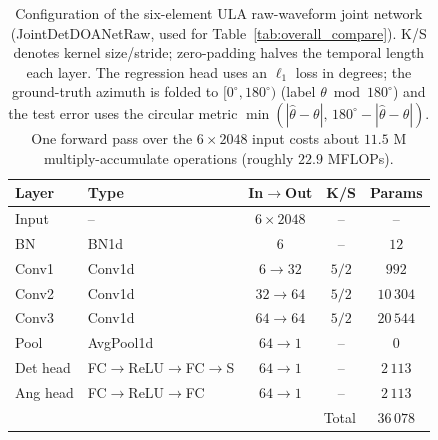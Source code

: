 \documentclass[sensors,article,submit,pdftex,moreauthors]{Definitions/mdpi}
\begin{document}
\begin{table}[H]
\centering
\caption{Configuration of the six-element ULA raw-waveform joint network (JointDetDOANetRaw, used for Table~\ref{tab:overall_compare}). K/S denotes kernel size/stride; zero-padding halves the temporal length each layer. The regression head uses an $\ell_1$ loss in degrees; the ground-truth azimuth is folded to $[0^\circ,180^\circ)$ (label $\theta\bmod 180^\circ$) and the test error uses the circular metric $\min\left(|\hat{\theta}-\theta|,\,180^\circ-|\hat{\theta}-\theta|\right)$. One forward pass over the $6\times2048$ input costs about $11.5$ M multiply-accumulate operations (roughly $22.9$ MFLOPs).}
\label{tab:net}
\small
\setlength{\tabcolsep}{4pt}
\begin{tabular}{llccc}
\toprule
Layer & Type & In$\rightarrow$Out & K/S & Params \\
\midrule
Input & -- & $6\times2048$ & -- & -- \\
BN & BN1d & $6$ & -- & $12$ \\
Conv1 & Conv1d & $6\to32$ & $5/2$ & $992$ \\
Conv2 & Conv1d & $32\to64$ & $5/2$ & $10\,304$ \\
Conv3 & Conv1d & $64\to64$ & $5/2$ & $20\,544$ \\
Pool & AvgPool1d & $64\to1$ & -- & $0$ \\
Det head & FC$\rightarrow$ReLU$\rightarrow$FC$\rightarrow$S & $64\to1$ & -- & $2\,113$ \\
Ang head & FC$\rightarrow$ReLU$\rightarrow$FC & $64\to1$ & -- & $2\,113$ \\
\midrule
\multicolumn{4}{r}{Total} & $36\,078$ \\
\bottomrule
\end{tabular}
\end{table}
\end{document}

